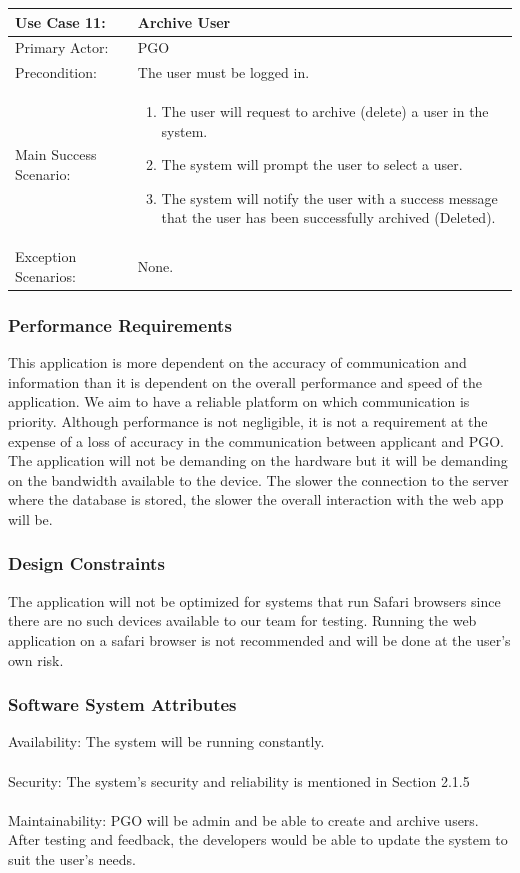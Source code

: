 \documentclass{article}
\begin{document}
\begin{tabular}{| m{5cm} | m{10cm} |}
\hline
Use Case 11: & Archive User \\
\hline
Primary Actor: & PGO \\
\hline
Precondition: & The user must be logged in. \\
\hline
Main Success Scenario: & \begin{enumerate} \itemsep0em \item The user will request to archive (delete) a user in the system. 
\item The system will prompt the user to select a user.
\item The system will notify the user with a success message that the user has been successfully archived (Deleted).
\end{enumerate} \\
\hline
Exception Scenarios: & None. \\
\hline
\end{tabular}
\subsubsection{Performance Requirements}
This application is more dependent on the accuracy of communication and information than it is dependent on the overall performance and speed of the application. We aim to have a reliable platform on which communication is priority. Although performance is not negligible, it is not a requirement at the expense of a loss of accuracy in the communication between applicant and PGO. The application will not be demanding on the hardware but it will be demanding on the bandwidth available to the device. The slower the connection to the server where the database is stored, the slower the overall interaction with the web app will be.
\subsubsection{Design Constraints}
The application will not be optimized for systems that run Safari browsers since there are no such devices available to our team for testing. Running the web application on a safari browser is not recommended and will be done at the user's own risk.
\subsubsection{Software System Attributes}
Availability: The system will be running constantly.  \\ \\
Security: The system's security and reliability is mentioned in Section 2.1.5 \\ \\ 
Maintainability: PGO will be admin and be able to create and archive users. \\
After testing and feedback, the developers would be able to update the system to suit the user's needs.
\end{document}
